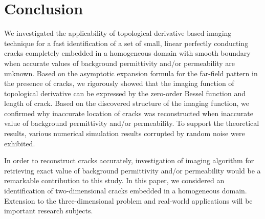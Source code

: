 \documentclass[a4,10pt]{article}
\theoremstyle{plain}
\theoremstyle{remark}
\begin{document}
\section{Conclusion}\label{sec:5}
We investigated the applicability of topological derivative based imaging technique for a fast identification of a set of small, linear perfectly conducting cracks completely embedded in a homogeneous domain with smooth boundary when accurate values of background permittivity and/or permeability are unknown. Based on the asymptotic expansion formula for the far-field pattern in the presence of cracks, we rigorously showed that the imaging function of topological derivative can be expressed by the zero-order Bessel function and length of crack. Based on the discovered structure of the imaging function, we confirmed why inaccurate location of cracks was reconstructed when inaccurate value of background permittivity and/or permeability. To support the theoretical results, various numerical simulation results corrupted by random noise were exhibited.

In order to reconstruct cracks accurately, investigation of imaging algorithm for retrieving exact value of background permittivity and/or permeability would be a remarkable contribution to this study. In this paper, we considered an identification of two-dimensional cracks embedded in a homogeneous domain. Extension to the three-dimensional problem and real-world applications will be important research subjects.
\end{document}

